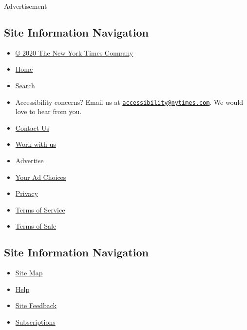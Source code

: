Advertisement

\hypertarget{site-information-navigation}{%
\subsection{Site Information
Navigation}\label{site-information-navigation}}

\begin{itemize}
\tightlist
\item
  \href{https://help.nytimes.com/hc/en-us/articles/115014792127-Copyright-notice}{©
  2020 The New York Times Company}
\item
  \href{https://www.nytimes.com}{Home}
\item
  \href{https://www.nytimes.com/search/}{Search}
\item
  Accessibility concerns? Email us at
  \href{mailto:accessibility@nytimes.com}{\nolinkurl{accessibility@nytimes.com}}.
  We would love to hear from you.
\item
  \href{https://help.nytimes.com/hc/en-us/articles/115015385887-Contact-Us}{Contact
  Us}
\item
  \href{https://www.nytco.com/careers/}{Work with us}
\item
  \href{https://nytmediakit.com/}{Advertise}
\item
  \href{https://help.nytimes.com/hc/en-us/articles/115014892108-Privacy-policy\#pp}{Your
  Ad Choices}
\item
  \href{https://help.nytimes.com/hc/en-us/articles/115014892108-Privacy-policy}{Privacy}
\item
  \href{https://help.nytimes.com/hc/en-us/articles/115014893428-Terms-of-service}{Terms
  of Service}
\item
  \href{https://help.nytimes.com/hc/en-us/articles/115014893968-Terms-of-sale}{Terms
  of Sale}
\end{itemize}

\hypertarget{site-information-navigation-1}{%
\subsection{Site Information
Navigation}\label{site-information-navigation-1}}

\begin{itemize}
\tightlist
\item
  \href{https://spiderbites.nytimes.com}{Site Map}
\item
  \href{https://help.nytimes.com/hc/en-us}{Help}
\item
  \href{https://help.nytimes.com/hc/en-us/articles/115015385887-Contact-Us?redir=myacc}{Site
  Feedback}
\item
  \href{https://www.nytimes.com/subscription?campaignId=37WXW}{Subscriptions}
\end{itemize}
